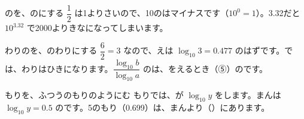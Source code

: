\begin{tsumazuki}{のを、のにする}
$\dfrac{1}{2}$ は1よりさいので、10のはマイナスです（$10^0=1$）。3.32だと $10^{3.32}$ で2000よりきなになってしまいます。
\end{tsumazuki}

\begin{tsumazuki}{わりのを、のわりにする}
$\dfrac{6}{2}=3$ なので、えは $\log_{10}3=0.477$ のはずです。では、わりはひきになります。$\dfrac{\log_{10}b}{\log_{10}a}$ のは、をえるとき（⑤）のです。
\end{tsumazuki}

\begin{tsumazuki}{もりを、ふつうのもりのようにむ}
もりでは、が $\log_{10}y$ をします。まんは $\log_{10}y=0.5$ のです。5のもり（0.699）は、まんより（）にあります。
\end{tsumazuki}

